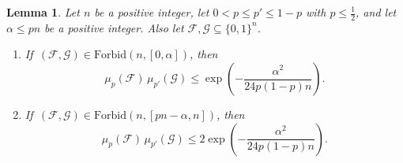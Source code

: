 \documentclass[10pt,a4paper]{amsart}
\newtheorem{lem}[thm]{Lemma}
\theoremstyle{remark}
\newcommand{\mik}{\leqslant}
\newcommand{\Fcal}{\mathcal{F}}
\newcommand{\Gcal}{\mathcal{G}}
\newcommand{\Forb}[2]{\mathrm{Forbid}\left(#1,#2\right)}
\begin{document}
\begin{lem} \label{l3.3}
Let $n$ be a positive integer, let $0<p\mik p'\mik 1-p$ with $p\mik \frac12$, and let $\alpha\mik pn$ be
a positive integer. Also let $\Fcal,\Gcal\subseteq \{0,1\}^n$.
\begin{enumerate}
\item[(i)] If\, $(\Fcal,\Gcal)\in\Forb{n}{[0,\alpha]}$, then
\begin{equation}\label{e3.6}
\mu_p(\Fcal)\,\mu_{p'}(\Gcal)\mik\exp\left(-\frac{\alpha^2}{24p(1-p)n}\right).
\end{equation}
\item[(ii)] If\, $(\Fcal,\Gcal)\in\Forb{n}{[pn-\alpha,n]}$, then
\begin{equation}\label{e3.7}
\mu_{p}(\Fcal)\,\mu_{p'}(\Gcal)\mik 2\exp\left(-\frac{\alpha^2}{24p(1-p)n}\right).
\end{equation}
\end{enumerate}
\end{lem}
\end{document}

